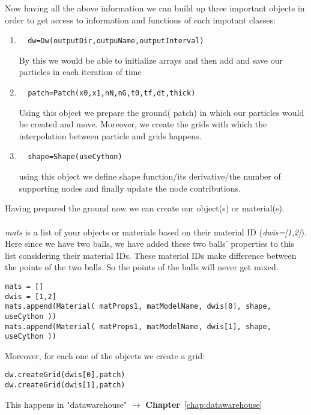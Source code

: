 \documentclass[11pt,fleqn]{book} %
\begin{document}
Now having all the above information we can build up three important objects in order to get access to information and functions of each impotant classes:

\begin{enumerate}

\item 
\begin{lstlisting}  
  dw=Dw(outputDir,outpuName,outputInterval)
\end{lstlisting}  
By this we would be able to initialize arrays and then add and save our particles in each iteration of time

\item 
\begin{lstlisting}  
  patch=Patch(x0,x1,nN,nG,t0,tf,dt,thick)
\end{lstlisting}  
Using this object we prepare the ground( patch) in which our particles would be created and move. Moreover, we create the grids with which the interpolation between particle and grids happens.
\item 
\begin{lstlisting}  
  shape=Shape(useCython)
\end{lstlisting}  
using this object we define shape function/its derivative/the number of supporting nodes and finally update the node contributions. 

\end{enumerate}

Having prepared the ground now we can create our object(s) or material(s).\\ \\
\emph{mats} is a list of your objects or materials based on their material ID (\emph{dwis=[1,2]}). Here since we have two balls, we have added these two balls' properties to this list considering their material IDs. These material IDs make difference between the points of the two balls. So the points of the balls will never get mixed.
\begin{lstlisting}
mats = []    
dwis = [1,2]    
mats.append(Material( matProps1, matModelName, dwis[0], shape, useCython ))
mats.append(Material( matProps1, matModelName, dwis[1], shape, useCython ))
\end{lstlisting}

Moreover, for each one of the objects we create a grid:
\begin{lstlisting}
dw.createGrid(dwis[0],patch)
dw.createGrid(dwis[1],patch)
\end{lstlisting}
This happens in "datawarehouse" $\rightarrow$ \textbf{Chapter}~\ref{chap:datawarehouse} \\ \\
\end{document}
